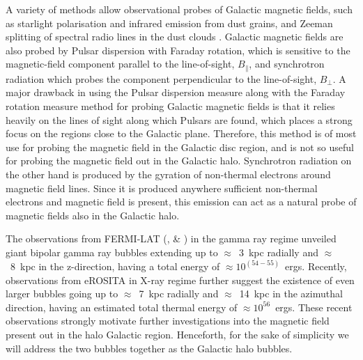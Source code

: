 \documentclass[usenatbib]{mnras}
\begin{document}
A variety of methods allow observational probes of Galactic magnetic fields, such as starlight polarisation and infrared emission from dust grains, and Zeeman splitting of spectral radio lines in the dust clouds \cite{Beck_2007}. Galactic magnetic fields are also probed by Pulsar dispersion with Faraday rotation, which is sensitive to the magnetic-field component parallel to the line-of-sight, $B_{\parallel}$, and synchrotron radiation which probes the component perpendicular to the line-of-sight, $B_{\perp}$. A major drawback in using the Pulsar dispersion measure along with the Faraday rotation measure method for probing Galactic magnetic fields is that it relies heavily on the lines of sight along which Pulsars are found, which places a strong focus on the regions close to the Galactic plane. Therefore, this method is of most use for probing the magnetic field in the Galactic disc region, and is not so useful for probing the magnetic field out in the Galactic halo. Synchrotron radiation on the other hand is produced by the gyration of non-thermal electrons around magnetic field lines. Since it is produced anywhere sufficient non-thermal electrons and magnetic field is present, this emission can act as a natural probe of magnetic fields also in the Galactic halo.

The observations from FERMI-LAT (\cite{Dobler_2010}, \cite{Su_2010} \& \cite{Su_2012}) in the gamma ray regime unveiled giant bipolar gamma ray bubbles extending up to $\approx$~3~kpc radially and $\approx$~8~kpc in the z-direction, having a total energy of $\approx 10^{(54-55)}$~ergs. Recently, observations from eROSITA \cite{eROSITA} in X-ray regime further suggest the existence of even larger bubbles going up to  $\approx$~7~kpc radially and $\approx$~14~kpc in the azimuthal direction, having an estimated total thermal energy of $\approx 10^{56}$~ergs. These recent observations strongly motivate further investigations into the magnetic field present out in the halo Galactic region. Henceforth, for the sake of simplicity we will address the two bubbles together as the Galactic halo bubbles.
\end{document}

